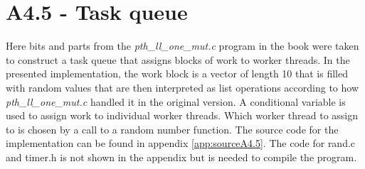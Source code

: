 \documentclass[a4paper,11pt,twoside]{article}
\begin{document}
\section{A4.5 - Task queue} 
Here bits and parts from the \textit{pth\_ll\_one\_mut.c} program in the book were taken to construct a task queue that assigns blocks of work to worker threads. In the presented implementation, the work block is a vector of length 10 that is filled with random values that are then interpreted as list operations according to how \textit{pth\_ll\_one\_mut.c} handled it in the original version. A conditional variable is used to assign work to individual worker threads. Which worker thread to assign to is chosen by a call to a random number function. The source code for the implementation can be found in appendix \ref{app:sourceA4.5}. The code for rand.c and timer.h is not shown in the appendix but is needed to compile the program. 



\appendix
\end{document}
